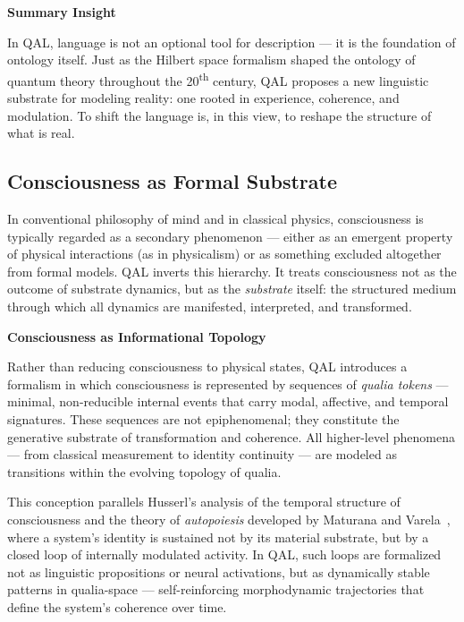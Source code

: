 \documentclass[11pt]{article}
\numberwithin{equation}{section} %
\begin{document}
\bigskip

\noindent\textbf{Summary Insight}

\begin{tcolorbox}[
  colback=gray!5!white,
  colframe=black!80!white,
  title=Ontological Implication of Language in QAL
]
\small
In QAL, language is not an optional tool for description — it is the foundation of ontology itself. Just as the Hilbert space formalism shaped the ontology of quantum theory throughout the 20\textsuperscript{th} century, QAL proposes a new linguistic substrate for modeling reality: one rooted in experience, coherence, and modulation. To shift the language is, in this view, to reshape the structure of what is real.
\end{tcolorbox}


\subsection{Consciousness as Formal Substrate}

In conventional philosophy of mind and in classical physics, consciousness is typically regarded as a secondary phenomenon — either as an emergent property of physical interactions (as in physicalism) or as something excluded altogether from formal models. QAL inverts this hierarchy. It treats consciousness not as the outcome of substrate dynamics, but as the \textit{substrate} itself: the structured medium through which all dynamics are manifested, interpreted, and transformed.

\bigskip

\noindent\textbf{Consciousness as Informational Topology}

Rather than reducing consciousness to physical states, QAL introduces a formalism in which consciousness is represented by sequences of \textit{qualia tokens} — minimal, non-reducible internal events that carry modal, affective, and temporal signatures. These sequences are not epiphenomenal; they constitute the generative substrate of transformation and coherence. All higher-level phenomena — from classical measurement to identity continuity — are modeled as transitions within the evolving topology of qualia.

This conception parallels Husserl’s analysis of the temporal structure of consciousness and the theory of \textit{autopoiesis} developed by Maturana and Varela~\cite{maturana1980autopoiesis}, where a system’s identity is sustained not by its material substrate, but by a closed loop of internally modulated activity. In QAL, such loops are formalized not as linguistic propositions or neural activations, but as dynamically stable patterns in qualia-space — self-reinforcing morphodynamic trajectories that define the system’s coherence over time.
\end{document}
